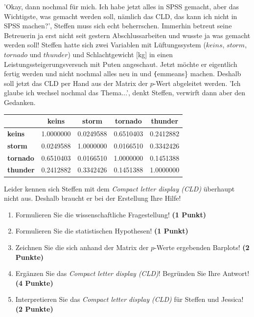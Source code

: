\documentclass[a4paper, 9pt]{scrartcl}\usepackage[]{graphicx}\usepackage[]{xcolor}
\newenvironment{knitrout}{}{} %
\begin{document}
'Okay, dann nochmal für mich. Ich habe jetzt alles in SPSS gemacht, aber das Wichtigste, was gemacht werden soll, nämlich das CLD, das kann ich nicht in SPSS machen?', Steffen muss sich echt beherrschen. Immerhin betreut seine Betreuerin ja erst nicht seit gestern Abschlussarbeiten und wusste ja was gemacht werden soll! Steffen hatte sich zwei Variablen mit Lüftungssystem ($keins$, $storm$, $tornado$ und $thunder$) und Schlachtgewicht [kg] in einen Leistungssteigerungsversuch mit Puten angeschaut. Jetzt möchte er eigentlich fertig werden und nicht nochmal alles neu in \Rlogo und \texttt\{emmeans\} machen. Deshalb soll jetzt das CLD per Hand aus der Matrix der $p$-Wert abgeleitet werden. 'Ich glaube ich wechsel nochmal das Thema...', denkt Steffen, verwirft dann aber den Gedanken.

\begin{knitrout}
\color{fgcolor}\begin{table}[!h]
\centering\begingroup\fontsize{10}{12}\selectfont

\begin{tabular}{>{}lcccc}
\toprule
\textbf{ } & \textbf{keins} & \textbf{storm} & \textbf{tornado} & \textbf{thunder}\\
\midrule
\textbf{keins} & 1.0000000 & 0.0249588 & 0.6510403 & 0.2412882\\
\textbf{storm} & 0.0249588 & 1.0000000 & 0.0166510 & 0.3342426\\
\textbf{tornado} & 0.6510403 & 0.0166510 & 1.0000000 & 0.1451388\\
\textbf{thunder} & 0.2412882 & 0.3342426 & 0.1451388 & 1.0000000\\
\bottomrule
\end{tabular}
\endgroup{}
\end{table}

\end{knitrout}

Leider kennen sich Steffen mit dem \textit{Compact letter display (CLD)} überhaupt nicht aus. Deshalb braucht er bei der Erstellung Ihre Hilfe!

\begin{enumerate}
  \item Formulieren Sie die wissenschaftliche Fragestellung! \textbf{(1 Punkt)}
  \item Formulieren Sie die statistischen Hypothesen! \textbf{(1 Punkt)}
\item Zeichnen Sie die sich anhand der Matrix der $p$-Werte ergebenden Barplots! \textbf{(2 Punkte)}
\item Ergänzen Sie das \textit{Compact letter display (CLD)}! Begründen Sie Ihre Antwort! \textbf{(4 Punkte)}
\item Interpretieren Sie das \textit{Compact letter display (CLD)} für Steffen und Jessica! \textbf{(2 Punkte)} 
\end{enumerate}
\end{document}
